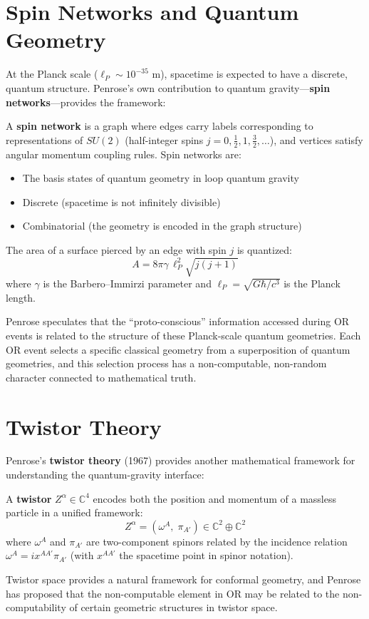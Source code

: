\documentclass[11pt,a4paper]{report}
\begin{document}
\section{Spin Networks and Quantum Geometry}

At the Planck scale ($\ell_P \sim 10^{-35}$ m), spacetime is expected to have a discrete, quantum structure. Penrose's own contribution to quantum gravity---\textbf{spin networks}---provides the framework:

\begin{definitionbox}
A \textbf{spin network} is a graph where edges carry labels corresponding to representations of $SU(2)$ (half-integer spins $j = 0, \frac{1}{2}, 1, \frac{3}{2}, \ldots$), and vertices satisfy angular momentum coupling rules. Spin networks are:
\begin{itemize}[leftmargin=1.5em]
  \item The basis states of quantum geometry in loop quantum gravity
  \item Discrete (spacetime is not infinitely divisible)
  \item Combinatorial (the geometry is encoded in the graph structure)
\end{itemize}
The area of a surface pierced by an edge with spin $j$ is quantized:
\[
  A = 8\pi \gamma\, \ell_P^2 \sqrt{j(j+1)}
\]
where $\gamma$ is the Barbero--Immirzi parameter and $\ell_P = \sqrt{G\hbar/c^3}$ is the Planck length.
\end{definitionbox}

Penrose speculates that the ``proto-conscious'' information accessed during OR events is related to the structure of these Planck-scale quantum geometries. Each OR event selects a specific classical geometry from a superposition of quantum geometries, and this selection process has a non-computable, non-random character connected to mathematical truth.

\section{Twistor Theory}

Penrose's \textbf{twistor theory} (1967) provides another mathematical framework for understanding the quantum-gravity interface:

\begin{mathbox}
\vspace{-6pt}
A \textbf{twistor} $Z^\alpha \in \mathbb{C}^4$ encodes both the position and momentum of a massless particle in a unified framework:
\[
  Z^\alpha = (\omega^A,\; \pi_{A'}) \in \mathbb{C}^2 \oplus \mathbb{C}^2
\]
where $\omega^A$ and $\pi_{A'}$ are two-component spinors related by the incidence relation $\omega^A = ix^{AA'}\pi_{A'}$ (with $x^{AA'}$ the spacetime point in spinor notation).

Twistor space provides a natural framework for conformal geometry, and Penrose has proposed that the non-computable element in OR may be related to the non-computability of certain geometric structures in twistor space.
\vspace{-4pt}
\end{mathbox}
\end{document}

